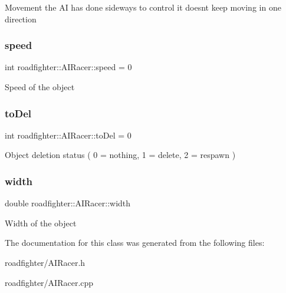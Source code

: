 Movement the AI has done sideways to control it doesn\textquotesingle{}t keep moving in one direction \mbox{\label{classroadfighter_1_1AIRacer_a37f6706ba77522ae4efe782da0125062}} 
\subsubsection{\texorpdfstring{speed}{speed}}
{\footnotesize\ttfamily int roadfighter\+::\+A\+I\+Racer\+::speed = 0\hspace{0.3cm}{\ttfamily [protected]}}

Speed of the object \mbox{\label{classroadfighter_1_1AIRacer_a7cfbfadf56859ab7865dd080376471c0}} 
\subsubsection{\texorpdfstring{to\+Del}{toDel}}
{\footnotesize\ttfamily int roadfighter\+::\+A\+I\+Racer\+::to\+Del = 0\hspace{0.3cm}{\ttfamily [protected]}}

Object deletion status ( 0 = nothing, 1 = delete, 2 = respawn ) \mbox{\label{classroadfighter_1_1AIRacer_afb07abbbb10e4d80202390fd940155b1}} 
\subsubsection{\texorpdfstring{width}{width}}
{\footnotesize\ttfamily double roadfighter\+::\+A\+I\+Racer\+::width\hspace{0.3cm}{\ttfamily [protected]}}

Width of the object 

The documentation for this class was generated from the following files\+:\begin{DoxyCompactItemize}
\item 
roadfighter/A\+I\+Racer.\+h\item 
roadfighter/A\+I\+Racer.\+cpp\end{DoxyCompactItemize}
